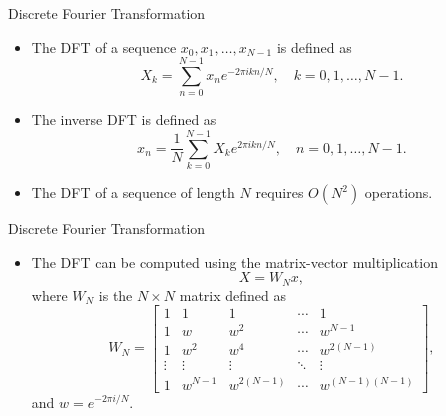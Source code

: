 \documentclass{beamer}
\begin{document}
\begin{frame}{Discrete Fourier Transformation}
    \begin{itemize}
        \item The DFT of a sequence $x_0,x_1,\ldots,x_{N-1}$ is defined as
        \[
        X_k = \sum_{n=0}^{N-1}x_n e^{-2\pi i k n/N},\quad k=0,1,\ldots,N-1.
        \]
        \item The inverse DFT is defined as
        \[
        x_n = \frac{1}{N}\sum_{k=0}^{N-1}X_k e^{2\pi i k n/N},\quad n=0,1,\ldots,N-1.
        \]
        \item The DFT of a sequence of length $N$ requires $O(N^2)$ operations.
    \end{itemize}
\end{frame}
\begin{frame}{Discrete Fourier Transformation}
    \begin{itemize}
        \item The DFT can be computed using the matrix-vector multiplication
        \[
        X = W_N x,
        \]
        where $W_N$ is the $N\times N$ matrix defined as
        \[
        W_N = \begin{bmatrix}
        1 & 1 & 1 & \cdots & 1\\
        1 & w & w^2 & \cdots & w^{N-1}\\
        1 & w^2 & w^4 & \cdots & w^{2(N-1)}\\
        \vdots & \vdots & \vdots & \ddots & \vdots\\
        1 & w^{N-1} & w^{2(N-1)} & \cdots & w^{(N-1)(N-1)}
        \end{bmatrix},
        \]
        and $w = e^{-2\pi i/N}$.
    \end{itemize}
\end{frame}
\end{document}
